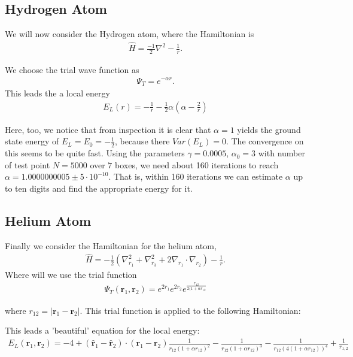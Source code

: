 \subsection{Hydrogen Atom}
We will now consider the Hydrogen atom, where the Hamiltonian is
\begin{align}
  \hat{H} = \frac{-1}{2}\nabla^2 - \frac{1}{r}.
\end{align}

We choose the trial wave function as
  \begin{align}
    \Psi_T = e^{-\alpha r}.
  \end{align}
This leads the a local energy
  \begin{align}
    E_L(r) = - \frac{1}{r} - \frac{1}{2}\alpha(\alpha - \frac{2}{r})
  \end{align}

Here, too, we notice that from inspection it is clear that $\alpha = 1$ yields the ground state energy of $E_L = E_0 = -\frac{1}{2}$, because there $Var(E_L) = 0$. The convergence on this seems to be quite fast. Using the parameters $\gamma = 0.0005$, $\alpha_0 = 3$ with number of test point $N = 5000$ over $7$ boxes, we need about 160 iterations to reach $\alpha = 1.0000000005 \pm 5 \cdot 10^{-10}$. That is, within 160 iterations we can estimate $\alpha$ up to ten digits and find the appropriate energy for it. 




\subsection{Helium Atom}
Finally we consider the Hamiltonian for the helium atom,
\begin{align}
  \hat{H} = -\frac{1}{2}(\nabla_{r_1}^2 + \nabla_{r_3}^2 + 2\nabla_{r_1}\cdot \nabla_{r_2}) - \frac{1}{r}.
\end{align}
Where will we use the trial function
  \begin{align}
    \Psi_T (\textbf{r}_1,\textbf{r}_2) = e^{2r_1}e^{2r_2}e^{\frac{r_{12}}{2(1+\alpha r_{12}}}
  \end{align}

where $r_{12} = |\textbf{r}_1 - \textbf{r}_2 |$. This trial function is applied to the following Hamiltonian:


This leads a 'beautiful' equation for the local energy:
  \begin{align}
    E_L(\textbf{r}_1,\textbf{r}_2) = -4  + (\hat{\textbf{r}}_1 - \hat{\textbf{r}}_2) \cdot (\textbf{r}_1 - \textbf{r}_2) \frac{1}{r_{12}(1+\alpha r_{12})^2} -  \frac{1}{r_{12}(1+\alpha r_{12})^3} - \frac{1}{r_{12}(4(1+\alpha r_{12}))^4} + \frac{1}{r_{1,2}}   \end{align}
  
